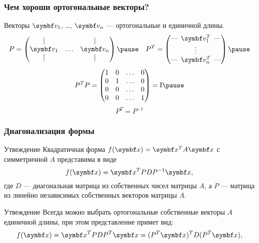 \begin{frame}
    \frametitle{Чем хороши ортогональные векторы?}

    Векторы $\bv_1$, \ldots, $\bv_n$ — ортогональные и единичной длины.
    \[
    P = \begin{pmatrix}
        \vert &  & \vert \\
        \bv_1 & \ldots & \bv_n \\
        \vert &  & \vert \\
    \end{pmatrix}    \pause \quad
    P^T = \begin{pmatrix}
\text{—}  \hspace{-0.2cm} & \bv_1^T & \hspace{-0.2cm}  \text{—} \\
 & \vdots &  \\
\text{—}  \hspace{-0.2cm} & \bv_n^T & \hspace{-0.2cm}  \text{—} \\
        \end{pmatrix}    \pause
    \]
%
    \[
    P^T P = \begin{pmatrix}        
        1 & 0 & \ldots & 0 \\
        0 & 1 & \ldots & 0 \\
        0 & 0 & \ldots & 0 \\
        0 & 0 & \ldots & 1 \\
    \end{pmatrix}  = \Id   \pause
    \]
%
    \[
    P^T = P^{-1}    
    \]
    
\end{frame}

\begin{frame}
    \frametitle{Диагонализация формы}

    \begin{block}{Утвеждение}
        Квадратичная форма $f(\bx) = \bx^T A \bx$ с симметричной $A$ представима в виде
        \[
        f(\bx) = \bx^T PDP^{-1} \bx,    
        \] 
        где $D$ — диагональная матрица из собственных чисел матрицы $A$, 
        а $P$ — матрица из линейно независимых собственных векторов матрицы $A$.
    \end{block}
    \pause
\begin{block}{Утвеждение}
    Всегда можно выбрать ортогональные собственные векторы $A$ единичной длины, 
    при этом представление примет вид:
    \[
    f(\bx) = \bx^T PDP^T \bx = (P^T \bx)^T D (P^T \bx),    
    \] 
\end{block}
    
\end{frame}


